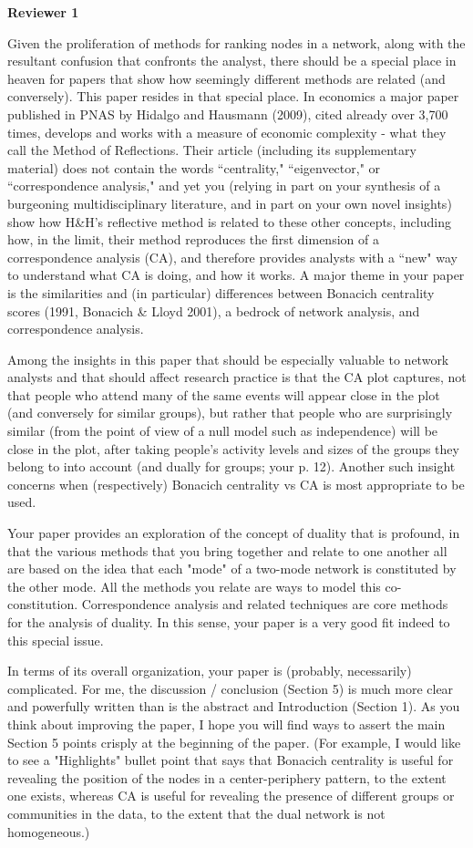 \documentclass[]{letter}
\begin{document}
\textbf{Reviewer 1}

Given the proliferation of methods for ranking nodes in a network, along with the resultant confusion that confronts the analyst, there should be a special place in heaven for papers that show how seemingly different methods are related (and conversely). This paper resides in that special place. In economics a major paper published in PNAS by Hidalgo and Hausmann (2009), cited already over 3,700 times, develops and works with a measure of economic complexity - what they call the Method of Reflections. Their article (including its supplementary material) does not contain the words ``centrality," ``eigenvector," or ``correspondence analysis," and yet you (relying in part on your synthesis of a burgeoning multidisciplinary literature, and in part on your own novel insights) show how H\&H's reflective method is related to these other concepts, including how, in the limit, their method reproduces the first dimension of a correspondence analysis (CA), and therefore provides analysts with a ``new" way to understand what CA is doing, and how it works. A major theme in your paper is the similarities and (in particular) differences between Bonacich centrality scores (1991, Bonacich \& Lloyd 2001), a bedrock of network analysis, and correspondence analysis.

Among the insights in this paper that should be especially valuable to network analysts and that should affect research practice is that the CA plot captures, not that people who attend many of the same events will appear close in the plot (and conversely for similar groups), but rather that people who are surprisingly similar (from the point of view of a null model such as independence) will be close in the plot, after taking people's activity levels and sizes of the groups they belong to into account (and dually for groups; your p. 12). Another such insight concerns when (respectively) Bonacich centrality vs CA is most appropriate to be used.

Your paper provides an exploration of the concept of duality that is profound, in that the various methods that you bring together and relate to one another all are based on the idea that each "mode" of a two-mode network is constituted by the other mode. All the methods you relate are ways to model this co-constitution. Correspondence analysis and related techniques are core methods for the analysis of duality. In this sense, your paper is a very good fit indeed to this special issue.

In terms of its overall organization, your paper is (probably, necessarily) complicated. For me, the discussion / conclusion (Section 5) is much more clear and powerfully written than is the abstract and Introduction (Section 1). As you think about improving the paper, I hope you will find ways to assert the main Section 5 points crisply at the beginning of the paper. (For example, I would like to see a "Highlights" bullet point that says that Bonacich centrality is useful for revealing the position of the nodes in a center-periphery pattern, to the extent one exists, whereas CA is useful for revealing the presence of different groups or communities in the data, to the extent that the dual network is not homogeneous.)
\end{document}
